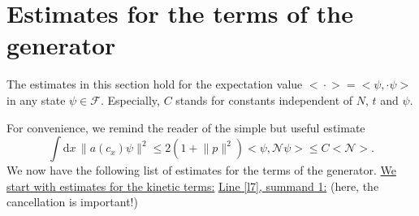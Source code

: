 \documentclass[11pt,a4paper,draft,DIV11]{scrartcl}	%
\newcommand{\fock}{\mathcal{F}}		%
\newcommand{\di}{\textrm{d}}		%
\newcommand{\Ncal}{\mathcal{N}}		%
\newcommand{\estlist}[2]{\underline{Line \ref{l#1}, summand #2:}}
\newcommand{\scal}[2]{\big<#1,#2\big>} %
\newcommand{\norm}[1]{\lVert#1\rVert}	%
\newcommand{\ev}[1]{\big<#1\big>}	%
\newcommand{\bd}{\begin{displaymath}}			%
\newcommand{\ed}{\end{displaymath}}
\begin{document}

\appendix
\section{Estimates for the terms of the generator}
\label{ch:generatorestimates}
The estimates in this section hold for the expectation value $\ev{\cdot} = \scal{\psi}{\cdot\psi}$ in any state $\psi \in \fock$. Especially, $C$ stands for constants independent of $N$, $t$ and $\psi$.

For convenience, we remind the reader of the simple but useful estimate
\bd
\int \di x\, \norm{a(c_x)\psi}^2 \leq 2(1+\norm{p}^2)\scal{\psi}{\Ncal\psi} \leq C\ev{\Ncal}.
\ed
We now have the following list of estimates for the terms of the generator.\newline
\underline{We start with estimates for the kinetic terms:}\newline
\estlist{7}{1} (here, the cancellation is important!)
\end{document}
